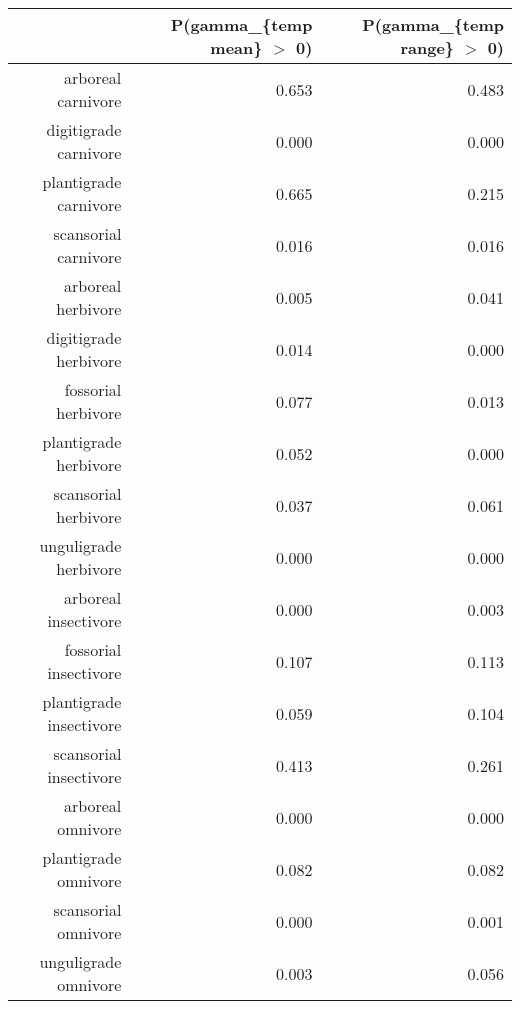 \begin{table}[ht]
\centering
\begin{tabular}{rrr}
  \hline
 & P(gamma\_\{temp mean\} $>$ 0) & P(gamma\_\{temp range\} $>$ 0) \\ 
  \hline
arboreal carnivore & 0.653 & 0.483 \\ 
  digitigrade carnivore & 0.000 & 0.000 \\ 
  plantigrade carnivore & 0.665 & 0.215 \\ 
  scansorial carnivore & 0.016 & 0.016 \\ 
  arboreal herbivore & 0.005 & 0.041 \\ 
  digitigrade herbivore & 0.014 & 0.000 \\ 
  fossorial herbivore & 0.077 & 0.013 \\ 
  plantigrade herbivore & 0.052 & 0.000 \\ 
  scansorial herbivore & 0.037 & 0.061 \\ 
  unguligrade herbivore & 0.000 & 0.000 \\ 
  arboreal insectivore & 0.000 & 0.003 \\ 
  fossorial insectivore & 0.107 & 0.113 \\ 
  plantigrade insectivore & 0.059 & 0.104 \\ 
  scansorial insectivore & 0.413 & 0.261 \\ 
  arboreal omnivore & 0.000 & 0.000 \\ 
  plantigrade omnivore & 0.082 & 0.082 \\ 
  scansorial omnivore & 0.000 & 0.001 \\ 
  unguligrade omnivore & 0.003 & 0.056 \\ 
   \hline
\end{tabular}
\label{tab:origin_temp}
\end{table}
